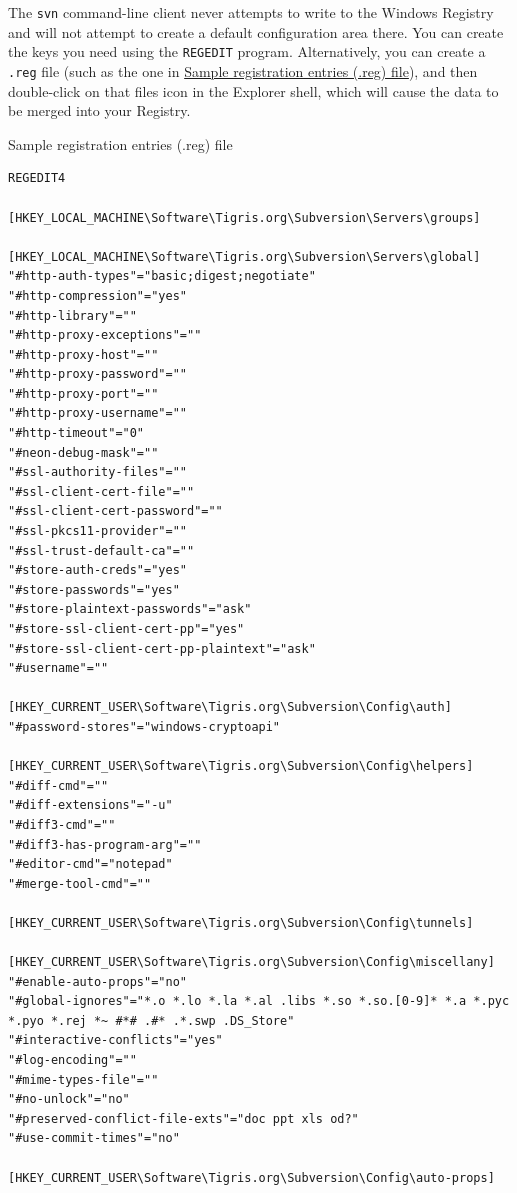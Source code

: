 The \texttt{svn} command-line client never attempts to write to the
Windows Registry and will not attempt to create a default configuration
area there. You can create the keys you need using the \texttt{REGEDIT}
program. Alternatively, you can create a \texttt{.reg} file (such as the
one in \hyperref[svn.advanced.confarea.windows-registry.ex-1]{Sample
registration entries (.reg) file}), and then double-click on that
file\textquotesingle s icon in the Explorer shell, which will cause the
data to be merged into your Registry.

\protect{}\label{svn.advanced.confarea.windows-registry.ex-1}
Sample registration entries (.reg) file

\begin{verbatim}
REGEDIT4

[HKEY_LOCAL_MACHINE\Software\Tigris.org\Subversion\Servers\groups]

[HKEY_LOCAL_MACHINE\Software\Tigris.org\Subversion\Servers\global]
"#http-auth-types"="basic;digest;negotiate"
"#http-compression"="yes"
"#http-library"=""
"#http-proxy-exceptions"=""
"#http-proxy-host"=""
"#http-proxy-password"=""
"#http-proxy-port"=""
"#http-proxy-username"=""
"#http-timeout"="0"
"#neon-debug-mask"=""
"#ssl-authority-files"=""
"#ssl-client-cert-file"=""
"#ssl-client-cert-password"=""
"#ssl-pkcs11-provider"=""
"#ssl-trust-default-ca"=""
"#store-auth-creds"="yes"
"#store-passwords"="yes"
"#store-plaintext-passwords"="ask"
"#store-ssl-client-cert-pp"="yes"
"#store-ssl-client-cert-pp-plaintext"="ask"
"#username"=""

[HKEY_CURRENT_USER\Software\Tigris.org\Subversion\Config\auth]
"#password-stores"="windows-cryptoapi"

[HKEY_CURRENT_USER\Software\Tigris.org\Subversion\Config\helpers]
"#diff-cmd"=""
"#diff-extensions"="-u"
"#diff3-cmd"=""
"#diff3-has-program-arg"=""
"#editor-cmd"="notepad"
"#merge-tool-cmd"=""

[HKEY_CURRENT_USER\Software\Tigris.org\Subversion\Config\tunnels]

[HKEY_CURRENT_USER\Software\Tigris.org\Subversion\Config\miscellany]
"#enable-auto-props"="no"
"#global-ignores"="*.o *.lo *.la *.al .libs *.so *.so.[0-9]* *.a *.pyc *.pyo *.rej *~ #*# .#* .*.swp .DS_Store"
"#interactive-conflicts"="yes"
"#log-encoding"=""
"#mime-types-file"=""
"#no-unlock"="no"
"#preserved-conflict-file-exts"="doc ppt xls od?"
"#use-commit-times"="no"

[HKEY_CURRENT_USER\Software\Tigris.org\Subversion\Config\auto-props]
\end{verbatim}


